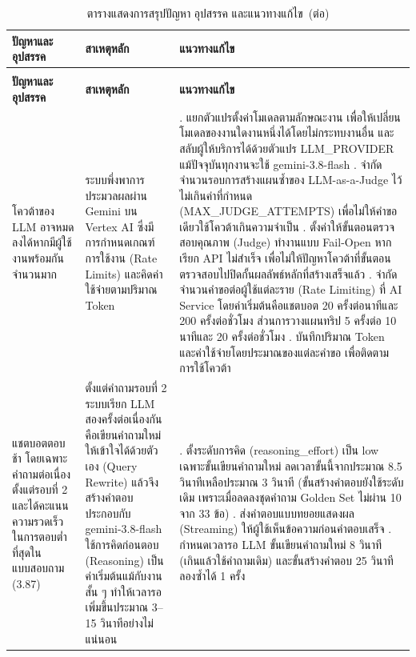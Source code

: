 {\small
\begin{longtable}{|>{\raggedright\arraybackslash}p{2.9cm}|>{\raggedright\arraybackslash}p{4.9cm}|>{\raggedright\arraybackslash}p{5.5cm}|}
\caption{ตารางแสดงการสรุปปัญหา อุปสรรค และแนวทางแก้ไข}\label{tab:problems}\\
\hline
\textbf{ปัญหาและอุปสรรค} & \textbf{สาเหตุหลัก} & \textbf{แนวทางแก้ไข} \\
\hline
\endfirsthead
\caption[]{ตารางแสดงการสรุปปัญหา อุปสรรค และแนวทางแก้ไข~(\textnormal{ต่อ})}\\
\hline
\textbf{ปัญหาและอุปสรรค} & \textbf{สาเหตุหลัก} & \textbf{แนวทางแก้ไข} \\
\hline
\endhead
โควต้าของ LLM อาจหมดลงได้หากมีผู้ใช้งานพร้อมกันจำนวนมาก & ระบบพึ่งพาการประมวลผลผ่าน Gemini บน Vertex AI ซึ่งมีการกำหนดเกณฑ์การใช้งาน (Rate Limits) และคิดค่าใช้จ่ายตามปริมาณ Token & 1. แยกตัวแปรตั้งค่าโมเดลตามลักษณะงาน เพื่อให้เปลี่ยนโมเดลของงานใดงานหนึ่งได้โดยไม่กระทบงานอื่น และสลับผู้ให้บริการได้ด้วยตัวแปร LLM\_PROVIDER แม้ปัจจุบันทุกงานจะใช้ gemini-3.8-flash \newline 2. จำกัดจำนวนรอบการสร้างแผนซ้ำของ LLM-as-a-Judge ไว้ไม่เกินค่าที่กำหนด (MAX\_JUDGE\_ATTEMPTS) เพื่อไม่ให้คำขอเดียวใช้โควต้าเกินความจำเป็น \newline 3. ตั้งค่าให้ขั้นตอนตรวจสอบคุณภาพ (Judge) ทำงานแบบ Fail-Open หากเรียก API ไม่สำเร็จ เพื่อไม่ให้ปัญหาโควต้าที่ขั้นตอนตรวจสอบไปปิดกั้นผลลัพธ์หลักที่สร้างเสร็จแล้ว \newline 4. จำกัดจำนวนคำขอต่อผู้ใช้แต่ละราย (Rate Limiting) ที่ AI Service โดยค่าเริ่มต้นคือแชตบอต 20 ครั้งต่อนาทีและ 200 ครั้งต่อชั่วโมง ส่วนการวางแผนทริป 5 ครั้งต่อ 10 นาทีและ 20 ครั้งต่อชั่วโมง \newline 5. บันทึกปริมาณ Token และค่าใช้จ่ายโดยประมาณของแต่ละคำขอ เพื่อติดตามการใช้โควต้า \\
\hline
แชตบอตตอบช้า โดยเฉพาะคำถามต่อเนื่องตั้งแต่รอบที่ 2 และได้คะแนนความรวดเร็วในการตอบต่ำที่สุดในแบบสอบถาม (3.87) & ตั้งแต่คำถามรอบที่ 2 ระบบเรียก LLM สองครั้งต่อเนื่องกัน คือเขียนคำถามใหม่ให้เข้าใจได้ด้วยตัวเอง (Query Rewrite) แล้วจึงสร้างคำตอบ ประกอบกับ gemini-3.8-flash ใช้การคิดก่อนตอบ (Reasoning) เป็นค่าเริ่มต้นแม้กับงานสั้น ๆ ทำให้เวลารอเพิ่มขึ้นประมาณ 3--15 วินาทีอย่างไม่แน่นอน & 1. ตั้งระดับการคิด (reasoning\_effort) เป็น low เฉพาะขั้นเขียนคำถามใหม่ ลดเวลาขั้นนี้จากประมาณ 8.5 วินาทีเหลือประมาณ 3 วินาที (ขั้นสร้างคำตอบยังใช้ระดับเดิม เพราะเมื่อลดลงชุดคำถาม Golden Set ไม่ผ่าน 10 จาก 33 ข้อ) \newline 2. ส่งคำตอบแบบทยอยแสดงผล (Streaming) ให้ผู้ใช้เห็นข้อความก่อนคำตอบเสร็จ \newline 3. กำหนดเวลารอ LLM ขั้นเขียนคำถามใหม่ 8 วินาที (เกินแล้วใช้คำถามเดิม) และขั้นสร้างคำตอบ 25 วินาที ลองซ้ำได้ 1 ครั้ง \\

\end{longtable}}
